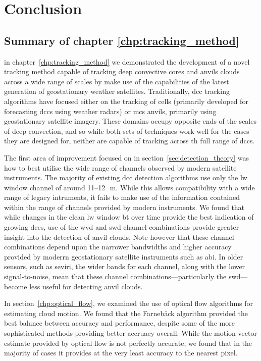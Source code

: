 \chapter{Conclusion} \label{chp:conclusion}

\section{Summary of chapter \ref{chp:tracking_method}}

in chapter~\ref{chp:tracking_method} we demonstrated the development of a novel tracking method capable of tracking deep convective cores and anvils clouds across a wide range of scales by make use of the capabilities of the latest generation of geostationary weather satellites.
Traditionally, \acrshort{dcc} tracking algorithms have focused either on the tracking of cells (primarily developed for forecasting \acrshort{dcc}s using weather radars) or \acrshort{mcs} anvils, primarily using geostationary satellite imagery.
These domains occupy opposite ends of the scales of deep convection, and so while both sets of techniques work well for the cases they are designed for, neither are capable of tracking across th full range of \acrshort{dcc}s.

The first area of improvement focused on in section~\ref{sec:detection_theory} was how to best utilise the wide range of channels observed by modern satellite instruments.
The majority of existing \acrshort{dcc} detection algorithms use only the \acrshort{lw} window channel of around 11--12\,\unit{\mu m}.
While this allows compatibility with a wide range of legacy intruments, it fails to make use of the information contained within the range of channels provided by modern instruments.
We found that while changes in the clean \acrshort{lw} window \acrshort{bt} over time provide the best indication of growing \acrshort{dcc}s, use of the \acrshort{wvd} and \acrshort{swd} channel combinations provide greater insight into the detection of anvil clouds.
Note however that these channel combinations depend upon the narrower bandwidths and higher accuracy provided by moderrn geostationary satellite instruments such as \acrshort{abi}.
In older sensors, such as \acrshort{seviri}, the wider bands for each channel, along with the lower signal-to-noise, mean that these channel combinations---particularly the \acrshort{swd}---become less useful for detecting anvil clouds.

In section~\ref{chp:optical_flow}, we examined the use of optical flow algorithms for estimating cloud motion.
We found that the Farnebäck algorithm provided the best balance between accuracy and performance, despite some of the more sophisticated methods providing better accruacy overall.
While the motion vector estimate provided by optical flow is not perfectly accurate, we found that in the majority of cases it provides at the very least accuracy to the nearest pixel.

